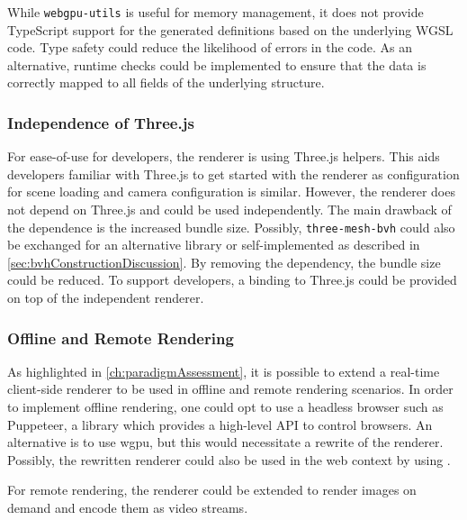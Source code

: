 While \texttt{webgpu-utils} \cite{webgpuUtilsLib} is useful for memory management, it does not provide TypeScript support for the generated definitions based on the underlying \gls{WGSL} code. Type safety could reduce the likelihood of errors in the code. As an alternative, runtime checks could be implemented to ensure that the data is correctly mapped to all fields of the underlying structure.

\subsubsection*{Independence of Three.js}

For ease-of-use for developers, the renderer is using \gls{Three.js} helpers. This aids developers familiar with \gls{Three.js} to get started with the renderer as configuration for scene loading and camera configuration is similar. However, the renderer does not depend on \gls{Three.js} and could be used independently. The main drawback of the dependence is the increased bundle size. Possibly, \texttt{three-mesh-bvh} \cite{threeMeshBvh} could also be exchanged for an alternative library or self-implemented as described in \autoref{sec:bvhConstructionDiscussion}. By removing the dependency, the bundle size could be reduced. To support developers, a binding to \gls{Three.js} could be provided on top of the independent renderer.

\subsubsection*{Offline and Remote Rendering}

As highlighted in \autoref{ch:paradigmAssessment}, it is possible to extend a real-time client-side renderer to be used in offline and remote rendering scenarios. In order to implement offline rendering, one could opt to use a headless browser such as Puppeteer, a  library which provides a high-level \gls{API} to control browsers. An alternative is to use \gls{wgpu}, but this would necessitate a rewrite of the renderer. Possibly, the rewritten renderer could also be used in the web context by using .

For remote rendering, the renderer could be extended to render images on demand and encode them as video streams.

